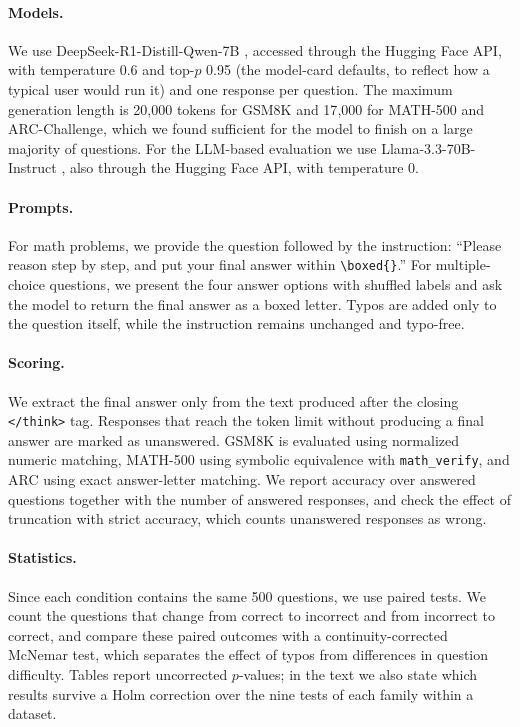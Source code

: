 \documentclass[11pt]{article}
\begin{document}
\paragraph{Models.}
We use DeepSeek-R1-Distill-Qwen-7B \citep{deepseekr1}, accessed through the
Hugging Face API, with temperature 0.6 and top-$p$ 0.95 (the model-card
defaults, to reflect how a typical user would run it) and one response per
question. The maximum generation length is 20{,}000 tokens for GSM8K and
17{,}000 for MATH-500 and ARC-Challenge, which we found sufficient for the model
to finish on a large majority of questions. For the LLM-based evaluation we use
Llama-3.3-70B-Instruct \citep{llama3}, also through the Hugging Face API, with
temperature 0.

\paragraph{Prompts.}
For math problems, we provide the question followed by the instruction:
``Please reason step by step, and put your final answer within
\texttt{\textbackslash boxed\{\}}.'' For multiple-choice questions, we present
the four answer options with shuffled labels and ask the model to return the
final answer as a boxed letter. Typos are added only to the question itself,
while the instruction remains unchanged and typo-free.

\paragraph{Scoring.}
We extract the final answer only from the text produced after the closing
\texttt{</think>} tag. Responses that reach the token limit without producing a
final answer are marked as unanswered. GSM8K is evaluated using normalized
numeric matching, MATH-500 using symbolic equivalence with
\texttt{math\_verify}, and ARC using exact answer-letter matching. We report
accuracy over answered questions together with the number of answered
responses, and check the effect of truncation with strict accuracy, which
counts unanswered responses as wrong.

\paragraph{Statistics.}
Since each condition contains the same 500 questions, we use paired tests. We
count the questions that change from correct to incorrect and from incorrect to
correct, and compare these paired outcomes with a continuity-corrected McNemar
test, which separates the effect of typos from differences in question
difficulty. Tables report uncorrected $p$-values; in the text we also state
which results survive a Holm correction over the nine tests of each family
within a dataset.
\end{document}
